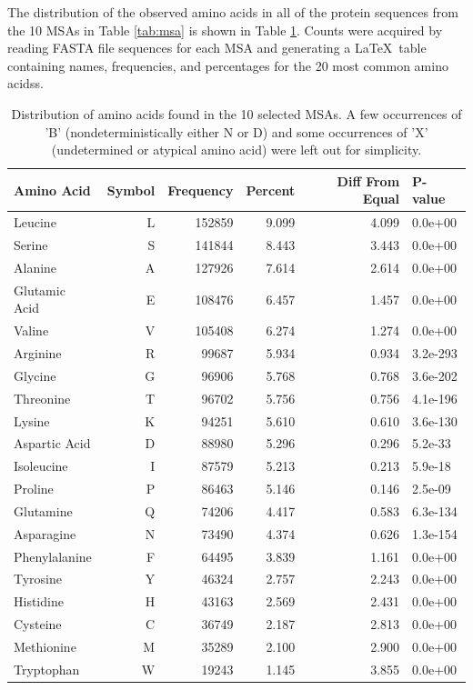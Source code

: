 The distribution of the observed amino acids in all of the protein sequences from the 10 MSAs in Table \ref{tab:msa} is shown in Table \ref{tab:aadist}. Counts were acquired by reading FASTA file sequences for each MSA and generating a \LaTeX~table containing names, frequencies, and percentages for the 20 most common \glspl{amino acids}.

\begin{table}[H] %
	\caption{Distribution of amino acids found in the 10 selected MSAs. A few occurrences of 'B' (nondeterministically either N or D) and some occurrences of 'X' (undetermined or atypical amino acid) were left out for simplicity.}
	\centering
    \vspace{2mm}
    \begin{tabular}{lrrrrl}
    \toprule
     Amino Acid & Symbol & Frequency & Percent & Diff From Equal & P-value \\
    \midrule
    Leucine & L & 152859 & 9.099 & 4.099 & 0.0e+00 \\
    Serine & S & 141844 & 8.443 & 3.443 & 0.0e+00 \\
    Alanine & A & 127926 & 7.614 & 2.614 & 0.0e+00 \\
    Glutamic Acid & E & 108476 & 6.457 & 1.457 & 0.0e+00 \\
    Valine & V & 105408 & 6.274 & 1.274 & 0.0e+00 \\
    Arginine & R & 99687 & 5.934 & 0.934 & 3.2e-293 \\
    Glycine & G & 96906 & 5.768 & 0.768 & 3.6e-202 \\
    Threonine & T & 96702 & 5.756 & 0.756 & 4.1e-196 \\
    Lysine & K & 94251 & 5.610 & 0.610 & 3.6e-130 \\
    Aspartic Acid & D & 88980 & 5.296 & 0.296 & 5.2e-33 \\
    Isoleucine & I & 87579 & 5.213 & 0.213 & 5.9e-18 \\
    Proline & P & 86463 & 5.146 & 0.146 & 2.5e-09 \\
    Glutamine & Q & 74206 & 4.417 & 0.583 & 6.3e-134 \\
    Asparagine & N & 73490 & 4.374 & 0.626 & 1.3e-154 \\
    Phenylalanine & F & 64495 & 3.839 & 1.161 & 0.0e+00 \\
    Tyrosine & Y & 46324 & 2.757 & 2.243 & 0.0e+00 \\
    Histidine & H & 43163 & 2.569 & 2.431 & 0.0e+00 \\
    Cysteine & C & 36749 & 2.187 & 2.813 & 0.0e+00 \\
    Methionine & M & 35289 & 2.100 & 2.900 & 0.0e+00 \\
    Tryptophan & W & 19243 & 1.145 & 3.855 & 0.0e+00 \\
    \bottomrule
    \end{tabular}
	\label{tab:aadist}
\end{table}

